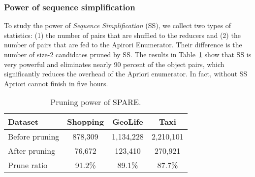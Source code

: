 \subsubsection{Power of sequence simplification}
To study the power of \emph{Sequence Simplification} (SS),
we collect two types of statistics: (1) the number of pairs that
are shuffled to the reducers and (2) the number of pairs that
are fed to the Apirori Enumerator. 
Their difference %
is the number of size-$2$ candidates pruned by SS.
The results in Table~\ref{tbl:pruning} show that %
SS is very powerful and eliminates nearly 90 percent of the object pairs, 
which significantly reduces the overhead of %
the Apriori enumerator.
In fact, without SS Apriori cannot
finish in five hours.



\begin{table}[h]
\centering
\caption{Pruning power of SPARE.}
\label{tbl:pruning}
\begin{tabular}{|l|c|c|c|}
\hline 
\textbf{Dataset} & \textbf{Shopping} & \textbf{GeoLife} & \textbf{Taxi} \\ 
\hline 
Before pruning & 878,309 &  1,134,228 & 2,210,101 \\ 
\hline 
After pruning & 76,672 & 123,410 & 270,921 \\ 
\hline 
Prune ratio & 91.2\% & 89.1\% & 87.7\% \\ 
\hline 
\end{tabular} 
\end{table}

